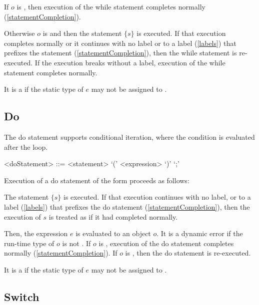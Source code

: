 \documentclass[makeidx]{article}
\begin{document}
\LMHash{}%
If $o$ is \FALSE, then execution of the while statement completes normally
(\ref{statementCompletion}).

\LMHash{}%
Otherwise $o$ is \TRUE{} and then the statement $\{s\}$ is executed.
If that execution completes normally or it continues with no label
or to a label (\ref{labels}) that prefixes the \WHILE{} statement
(\ref{statementCompletion}),
then the while statement is re-executed.
If the execution breaks without a label,
execution of the while statement completes normally.

\LMHash{}%
It is a  if
the static type of $e$ may not be assigned to .


\subsection{Do}

\LMHash{}%
The do statement supports conditional iteration,
where the condition is evaluated after the loop.

\begin{grammar}
<doStatement> ::= \DO{} <statement> \WHILE{} `(' <expression> `)' `;'
\end{grammar}

\LMHash{}%
Execution of a do statement of the form 
proceeds as follows:

\LMHash{}%
The statement $\{s\}$ is executed.
If that execution continues with no label,
or to a label (\ref{labels}) that prefixes the do statement
(\ref{statementCompletion}),
then the execution of $s$ is treated as if it had completed normally.

\LMHash{}%
Then, the expression $e$ is evaluated to an object $o$.
It is a dynamic error if the run-time type of $o$ is not .
If $o$ is \FALSE, execution of the do statement completes normally
(\ref{statementCompletion}).
If $o$ is \TRUE, then the do statement is re-executed.

\LMHash{}%
It is a  if the static type of $e$
may not be assigned to .


\subsection{Switch}
\end{document}
